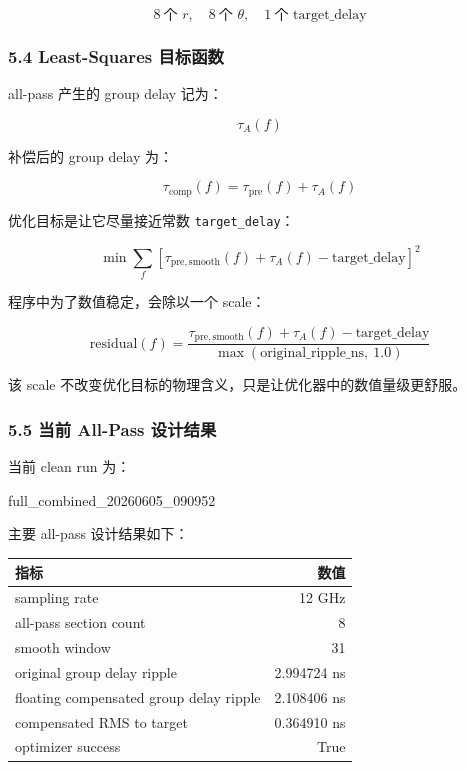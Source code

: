 \documentclass[
]{ctexart}
\newenvironment{Shaded}{}{}
\newcommand{\NormalTok}[1]{#1}
\begin{document}
\[
8\ \text{个 } r,\quad 8\ \text{个 } \theta,\quad 1\ \text{个 target\_delay}
\]

\subsubsection{5.4 Least-Squares
目标函数}\label{least-squares-ux76eeux6807ux51fdux6570}

all-pass 产生的 group delay 记为：

\[
\tau_A(f)
\]

补偿后的 group delay 为：

\[
\tau_{\mathrm{comp}}(f)=\tau_{\mathrm{pre}}(f)+\tau_A(f)
\]

优化目标是让它尽量接近常数 \texttt{target\_delay}：

\[
\min \sum_f \left[\tau_{\mathrm{pre,smooth}}(f)+\tau_A(f)-\mathrm{target\_delay}\right]^2
\]

程序中为了数值稳定，会除以一个 scale：

\[
\mathrm{residual}(f)=
\frac{\tau_{\mathrm{pre,smooth}}(f)+\tau_A(f)-\mathrm{target\_delay}}
{\max(\mathrm{original\_ripple\_ns},\ 1.0)}
\]

该 scale 不改变优化目标的物理含义，只是让优化器中的数值量级更舒服。

\subsubsection{5.5 当前 All-Pass
设计结果}\label{ux5f53ux524d-all-pass-ux8bbeux8ba1ux7ed3ux679c}

当前 clean run 为：

\begin{Shaded}
\begin{Highlighting}[]
\NormalTok{full\_combined\_20260605\_090952}
\end{Highlighting}
\end{Shaded}

主要 all-pass 设计结果如下：

\begin{longtable}[]{@{}lr@{}}
\toprule\noalign{}
指标 & 数值 \\
\midrule\noalign{}
\endhead
\bottomrule\noalign{}
\endlastfoot
sampling rate & 12 GHz \\
all-pass section count & 8 \\
smooth window & 31 \\
original group delay ripple & 2.994724 ns \\
floating compensated group delay ripple & 2.108406 ns \\
compensated RMS to target & 0.364910 ns \\
optimizer success & True \\
\end{longtable}
\end{document}
